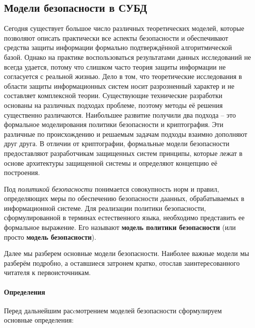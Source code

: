 \subsection{Модели безопасности в СУБД}

Сегодня существует большое число различных теоретических моделей, которые позволяют описать практически все аспекты безопасности и обеспечивают средства защиты информации формально подтверждённой алгоритмической базой. Однако на практике воспользоваться результатами данных исследований не всегда удается, потому что слишком часто теория защиты информации не согласуется с реальной жизнью. Дело в том, что теоретические исследования в области защиты информационных систем носит разрозненный характер и не составляет комплексной теории. Существующие технические разработки основаны на различных подходах проблеме, поэтому методы её решения существенно различаются. Наибольшее развитие получили два подхода -- это формальное моделирования политики безопасности и криптография. Эти различные по происхождению и решаемым задачам подходы взаимно дополняют друг друга. В отличии от криптографии, формальные модели безопасности предоставляют разработчикам защищенных систем принципы, которые лежат в основе архитектуры защищенной системы и определяют концепцию её построения.

Под \textit{политикой безопасности} понимается совокупность норм и правил, определяющих меры по обеспечению безопасности даанных, обрабатываемых в информационной системе.  Для реализации политики безопасности, сформулированной в терминах естест­венного языка, необходимо представить ее формальное выражение.  Его называют \textbf{модель политики безопасности} (или просто \textbf{модель безопасности}).

Далее мы разберем основные модели безопасности. Наиболее важные модели мы разберём подробно, а оставшиеся затронем кратко,  отослав заинтересованного читателя к первоисточникам.  

\paragraph{Определения}

Перед дальнейшим расcмотрением моделей безопасности сформулируем основные определения:

